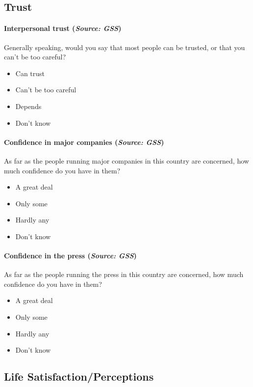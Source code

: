 \documentclass[letterpaper,12pt]{article}
\theoremstyle{proposition}
\begin{document}
\subsection*{Trust}

\paragraph{Interpersonal trust (\textit{Source: GSS})}
Generally speaking, would you say that most people can be trusted, or that you can’t be too careful?
\begin{itemize}[itemsep=-10pt,topsep=0pt]
\item Can trust
\item Can’t be too careful
\item Depends
\item Don’t know
\end{itemize}

\paragraph{Confidence in major companies (\textit{Source: GSS})}
As far as the people running major companies in this country are concerned, how much confidence do you have in them?
\begin{itemize}[itemsep=-10pt,topsep=0pt]
\item A great deal
\item Only some
\item Hardly any
\item Don’t know
\end{itemize}

\paragraph{Confidence in the press (\textit{Source: GSS})}
As far as the people running the press in this country are concerned, how much confidence do you have in them?
\begin{itemize}[itemsep=-10pt,topsep=0pt]
\item A great deal
\item Only some
\item Hardly any
\item Don’t know
\end{itemize}

\subsection*{Life Satisfaction/Perceptions}
\end{document}
